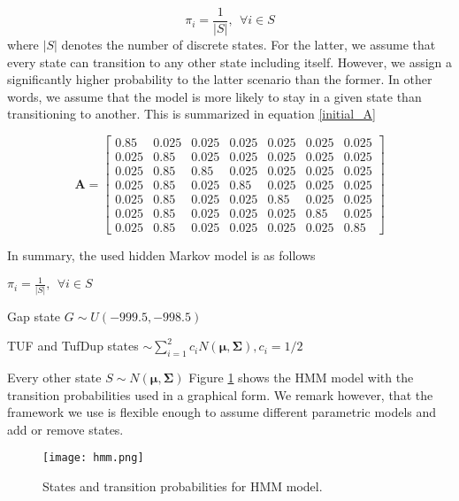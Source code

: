 \documentclass[12pt]{article}
\let\tempone\itemize
\let\temptwo\enditemize
\renewenvironment{itemize}{\tempone\setlength{\itemsep}{0pt}}{\temptwo}
\begin{document}
\begin{equation}
\pi_i = \frac{1}{|S|}, ~~ \forall i \in S
\end{equation}
where $|S|$ denotes the number of discrete states. For the latter,  we assume that every state can transition to any other state including itself. 
However, we assign a significantly higher probability to the latter
scenario than the former. In other words, we assume that the model is more likely to stay in a given state than transitioning to another. This is summarized in equation \ref{initial_A}

\begin{equation}
\mathbf{A} = \begin{bmatrix}0.85 & 0.025 & 0.025 & 0.025 & 0.025 & 0.025 & 0.025 \\ 

0.025 & 0.85 & 0.025 & 0.025 & 0.025 & 0.025 & 0.025 \\
0.025 & 0.85 & 0.85 & 0.025 & 0.025 & 0.025 & 0.025 \\
0.025 & 0.85 & 0.025 & 0.85 & 0.025 & 0.025 & 0.025 \\
0.025 & 0.85 & 0.025 & 0.025 & 0.85 & 0.025 & 0.025 \\
0.025 & 0.85 & 0.025 & 0.025 & 0.025 & 0.85 & 0.025 \\
0.025 & 0.85 & 0.025 & 0.025 & 0.025 & 0.025 & 0.85 
\end{bmatrix}
\label{initial_A}
\end{equation}

In summary, the used hidden Markov model is as follows

\begin{itemize}
	\item $\pi_i = \frac{1}{|S|}, ~~ \forall i \in S$
	\item Gap state $G\sim U(-999.5, -998.5)$
	\item TUF and TufDup states $\sim \sum_{i=1}^{2} c_i N(\boldsymbol{\mu}, \boldsymbol{\Sigma}), c_i = 1/2$
	\item Every other state $S \sim N(\boldsymbol{\mu}, \boldsymbol{\Sigma})$  
\end{itemize}
Figure \ref{hmm_figure}
shows the HMM model with the transition probabilities used in a graphical form.
We remark however, that the framework we use is flexible enough to assume different parametric models and add or remove states.

\begin{figure}[!htb]
	\begin{center}
		\texttt{[image: hmm.png]}
	\end{center}
	\caption{States and transition probabilities for HMM model.}
	\label{hmm_figure}
\end{figure} 
\end{document}
